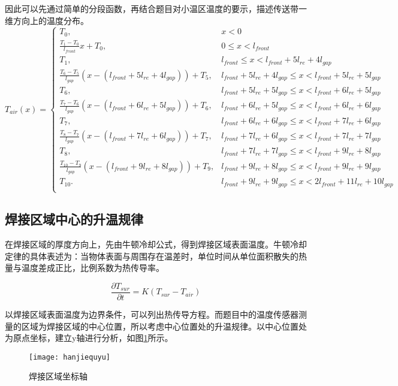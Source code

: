 \documentclass[withoutpreface,bwprint]{cumcmthesis} %
\begin{document}
因此可以先通过简单的分段函数，再结合题目对小温区温度的要示，描述传送带一维方向上的温度分布。
\[
T_{air}(x) = 
\begin{cases}
T_0, & x < 0\\
\frac{T_{1}-T_0}{l_{front}} x + T_0, & 0 \leq x < l_{front}\\
T_1, & l_{front} \leq x < l_{front}+5l_{re} + 4l_{gap}\\
\frac{T_6-T_5}{l_{gap}} (x- (l_{front}+5l_{re} + 4l_{gap})) + T_5, & l_{front}+5l_{re} + 4l_{gap} \leq x < l_{front}+5l_{re} + 5l_{gap}\\
T_6, & l_{front}+5l_{re} + 5l_{gap} \leq x < l_{front}+6l_{re} + 5l_{gap}\\
\frac{T_7-T_6}{l_{gap}} (x- (l_{front}+6l_{re} + 5l_{gap})) + T_6, & l_{front}+6l_{re} + 5l_{gap} \leq x < l_{front}+6l_{re} + 6l_{gap}\\
T_7, & l_{front}+6l_{re} + 6l_{gap} \leq x < l_{front}+7l_{re} + 6l_{gap}\\
\frac{T_8-T_7}{l_{gap}} (x- (l_{front}+7l_{re} + 6l_{gap})) + T_7, & l_{front}+7l_{re} + 6l_{gap} \leq x < l_{front}+7l_{re} + 7l_{gap}\\
T_8, &  l_{front}+7l_{re} + 7l_{gap} \leq x < l_{front}+9l_{re} + 8l_{gap}\\
\frac{T_{10}-T_9}{l_{gap}} (x- (l_{front}+9l_{re} + 8l_{gap})) + T_9, & l_{front}+9l_{re} + 8l_{gap} \leq x < l_{front}+9l_{re} + 9l_{gap}\\
T_{10}. & l_{front}+9l_{re} + 9l_{gap} \leq x < 2l_{front}+11l_{re} + 10l_{gap}\\
\end{cases}
\]

\subsection{焊接区域中心的升温规律}
在焊接区域的厚度方向上，先由牛顿冷却公式，得到焊接区域表面温度。牛顿冷却定律的具体表述为：当物体表面与周围存在温差时，单位时间从单位面积散失的热量与温度差成正比，比例系数为热传导率。

\begin{equation}
\frac{\partial T_{sur}}{\partial t} = K(T_{sur}-T_{air})
\end{equation}

以焊接区域表面温度为边界条件，可以列出热传导方程。而题目中的温度传感器测量的区域为焊接区域的中心位置，所以考虑中心位置处的升温规律。以中心位置处为原点坐标，建立y轴进行分析，如图\ref{fig:hanjiequyu}所示。
\begin{figure}[!h]
	\centering
	\texttt{[image: hanjiequyu]}
	\caption{焊接区域坐标轴}
	\label{fig:hanjiequyu}
\end{figure}
\end{document}
